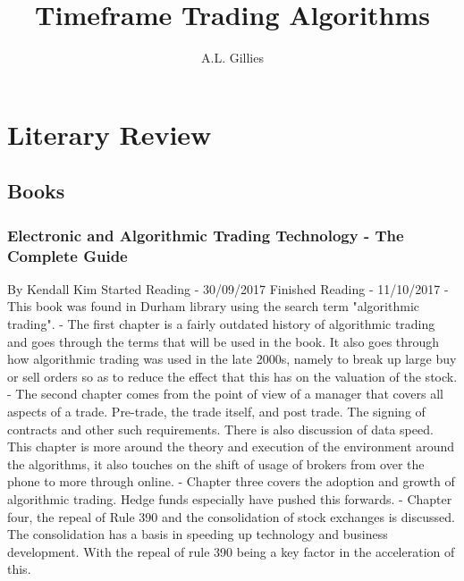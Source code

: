 \documentclass[12pt,a4paper]{article}
\title{Timeframe Trading Algorithms}
\author{A.L. Gillies}
\date{}
\begin{document}
\maketitle

\section*{Literary Review}

\subsection*{Books}

\subsubsection*{Electronic and Algorithmic Trading Technology - The Complete Guide}
By Kendall Kim \newline
Started Reading - 30/09/2017 \newline
Finished Reading -  11/10/2017 \newline
\newline
- This book was found in Durham library using the search term "algorithmic trading". \newline
- The first chapter is a fairly outdated history of algorithmic trading and goes through the terms that will be used in the book. It also goes through how algorithmic trading was used in the late 2000s, namely to break up large buy or sell orders so as to reduce the effect that this has on the valuation of the stock. \newline
- The second chapter comes from the point of view of a manager that covers all aspects of a trade. Pre-trade, the trade itself, and post trade. The signing of contracts and other such requirements. There is also discussion of data speed. This chapter is more around the theory and execution of the environment around the algorithms, it also touches on the shift of usage of brokers from over the phone to more through online. \newline
- Chapter three covers the adoption and growth of algorithmic trading. Hedge funds especially have pushed this forwards. \newline
- Chapter four, the repeal of Rule 390 and the consolidation of stock exchanges is discussed. The consolidation has a basis in speeding up technology and business development. With the repeal of rule 390 being a key factor in the acceleration of this. \newline
\end{document}
